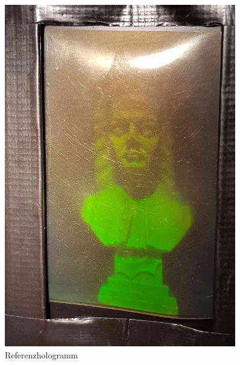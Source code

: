 \begin{figure}[htbp]
\begin{minipage}{0.45\textwidth}
                    \includegraphics[width=0.9\textwidth]{Abb/weislicht_ref.jpg}
                    \caption{Referenzhologramm}
                  \end{minipage}
                \end{figure}
